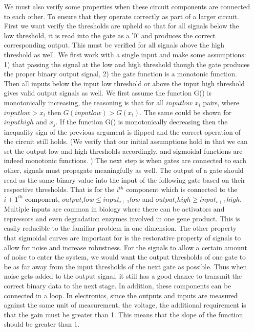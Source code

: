 \documentclass{article}
\begin{document}
\newline
We must also verify some properties when these circuit components are connected to each other.  To ensure that they operate correctly as part of a larger circuit. First we want verify the thresholds are upheld so that for all signals below the low threshold, it is read into the gate as a '0' and produces the correct corresponding output.  This must be verified for all signals above the high threshold as well. We first work with a single input and make some assumptions:  1) that passing the signal at the low and high threshold though the gate produces the proper binary output signal, 2) the gate function is a monotonic function.  Then all inputs below the input low threshold or above the input high threshold gives valid output signals as well.  We first assume the function G() is monotonically increasing, the reasoning is that for all $input low$ $x_i$ pairs, where $input low>x_i$ then $G(input low)>G(x_i)$.  The same could be shown for $input high$ and $x_j$.  If the function G() is monotonically decreasing then the inequality sign of the previous argument is flipped and the correct operation of the circuit still holds.  (We verify that our initial assumptions hold in that we can set the output low and high thresholds accordingly, and sigmoidal functions are indeed monotonic functions. )
\newline \newline
The next step is when gates are connected to each other, signals must propagate meaningfully as well.  The output of a gate should read as the same binary value into the input of the following gate based on their respective thresholds.  That is for the $i^{th}$ component which is connected to the $i+1^{th}$ component, $output_i low \leq input_{i+1} low$ and $output_i high \geq input_{i+1} high$.  Multiple inputs are common in biology where there can be activators and repressors and even degradation enzymes involved in one gene product.  This is easily reducible to the familiar problem in one dimension. 
\newline \newline
The other property that sigmoidal curves are important for is the restorative property of signals to allow for noise and increase robustness.  For the signals to allow a certain amount of noise to enter the system, we would want the output thresholds of one gate to be as far away from the input thresholds of the next gate as possible.  Thus when noise gets added to the output signal, it still has a good chance to transmit the correct binary data to the next stage.  In addition, these components can be connected in a loop.  In electronics, since the outputs and inputs are measured against the same unit of measurement, the voltage, the additional requirement is that the gain must be greater than 1.  This means that the slope of the function should be greater than 1.  
\newline \newline 
\end{document}
